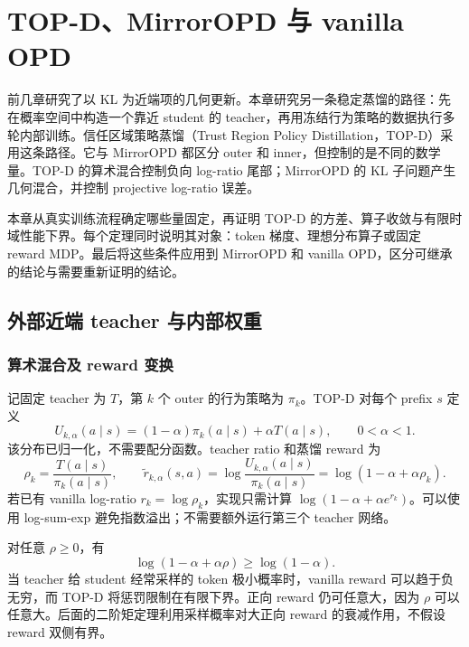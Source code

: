 \chapter{TOP-D、MirrorOPD 与 vanilla OPD}
\label{chap:topd}

前几章研究了以 KL 为近端项的几何更新。本章研究另一条稳定蒸馏的路径：先在概率空间中构造一个靠近 student 的 teacher，再用冻结行为策略的数据执行多轮内部训练。信任区域策略蒸馏（Trust Region Policy Distillation，TOP-D）\cite{topd26}采用这条路径。它与 MirrorOPD 都区分 outer 和 inner，但控制的是不同的数学量。TOP-D 的算术混合控制负向 log-ratio 尾部；MirrorOPD 的 KL 子问题产生几何混合，并控制 projective log-ratio 误差。

本章从真实训练流程确定哪些量固定，再证明 TOP-D 的方差、算子收敛与有限时域性能下界。每个定理同时说明其对象：token 梯度、理想分布算子或固定 reward MDP。最后将这些条件应用到 MirrorOPD 和 vanilla OPD，区分可继承的结论与需要重新证明的结论。

\section{外部近端 teacher 与内部权重}
\subsection{算术混合及 reward 变换}

记固定 teacher 为 $T$，第 $k$ 个 outer 的行为策略为 $\pi_k$。TOP-D 对每个 prefix $s$ 定义
\begin{equation}
 U_{k,\alpha}(a\mid s)=(1-\alpha)\pi_k(a\mid s)+\alpha T(a\mid s),
 \qquad 0<\alpha<1.
 \label{eq:topd-target}
\end{equation}
该分布已归一化，不需要配分函数。teacher ratio 和蒸馏 reward 为
\begin{equation}
 \rho_k=\frac{T(a\mid s)}{\pi_k(a\mid s)},\qquad
 \widetilde r_{k,\alpha}(s,a)=\log\frac{U_{k,\alpha}(a\mid s)}{\pi_k(a\mid s)}
 =\log(1-\alpha+\alpha\rho_k).
 \label{eq:topd-reward}
\end{equation}
若已有 vanilla log-ratio $r_k=\log\rho_k$，实现只需计算 $\log(1-\alpha+\alpha e^{r_k})$。可以使用 log-sum-exp 避免指数溢出；不需要额外运行第三个 teacher 网络。

对任意 $\rho\geq0$，有
\begin{equation}
 \log(1-\alpha+\alpha\rho)\geq\log(1-\alpha).
 \label{eq:topd-negative-floor}
\end{equation}
当 teacher 给 student 经常采样的 token 极小概率时，vanilla reward 可以趋于负无穷，而 TOP-D 将惩罚限制在有限下界。正向 reward 仍可任意大，因为 $\rho$ 可以任意大。后面的二阶矩定理利用采样概率对大正向 reward 的衰减作用，不假设 reward 双侧有界。

